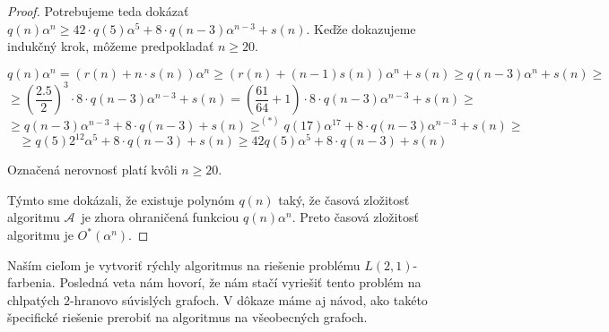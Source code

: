 \begin{proof}
    Potrebujeme teda dokázať $q(n) \alpha^n \ge 42 \cdot q(5) \alpha^5 + 8 \cdot q(n - 3) \alpha^{n-3} + s(n)$.
    Keďže dokazujeme indukčný krok, môžeme predpokladať $n \ge 20$.

    $$q(n) \alpha^n = \left(r(n) + n \cdot s(n) \right) \alpha^n \ge \left(r(n) + (n-1)s(n) \right) \alpha^n + s(n) \ge q(n-3) \alpha^n + s(n) \ge$$
    $$\ge \left(\frac{2.5}{2} \right)^3 \cdot 8 \cdot q(n-3) \alpha^{n-3} + s(n) = \left( \frac{61}{64} + 1\right) \cdot 8 \cdot q(n-3)\alpha^{n-3} + s(n) \ge $$
    $$\ge q(n-3) \alpha^{n-3} + 8 \cdot q(n-3) + s(n) \ge^{(*)} q(17) \alpha^{17} + 8 \cdot q(n-3)\alpha^{n-3} + s(n) \ge $$
    $$\ge q(5)2^{12}\alpha^{5} + 8 \cdot q(n-3) + s(n) \ge 42 q(5)\alpha^5 + 8 \cdot q(n-3) + s(n)$$

    Označená nerovnosť platí kvôli $n \ge 20$.

    Týmto sme dokázali, že existuje polynóm $q(n)$ taký, že časová zložitosť algoritmu $\mathcal{A}$ je
    zhora ohraničená funkciou $q(n)\alpha^n$. Preto časová zložitosť algoritmu je $O^*(\alpha^n)$. \qedhere

\end{proof}

Naším cieľom je vytvoriť rýchly algoritmus na riešenie problému $L(2,1)$-farbenia. Posledná veta
nám hovorí, že nám stačí vyriešiť tento problém na chlpatých $2$-hranovo súvislých grafoch. V dôkaze
máme aj návod, ako takéto špecifické riešenie prerobiť na algoritmus na všeobecných grafoch.


